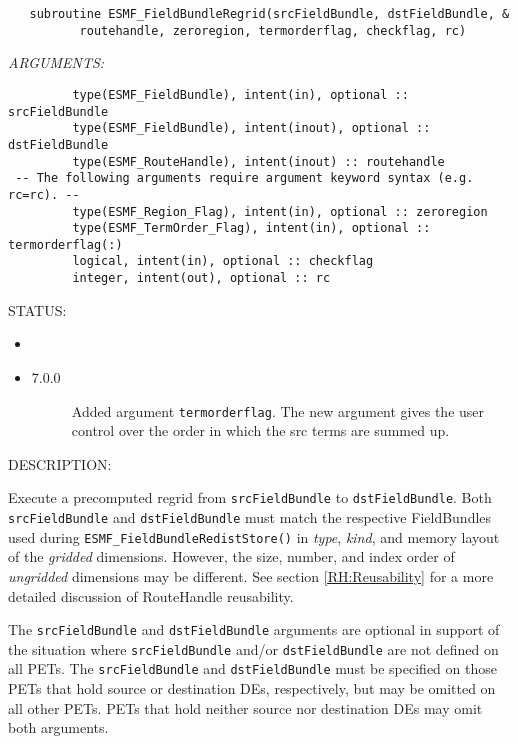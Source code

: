   
\begin{verbatim}   subroutine ESMF_FieldBundleRegrid(srcFieldBundle, dstFieldBundle, &
          routehandle, zeroregion, termorderflag, checkflag, rc)\end{verbatim}{\em ARGUMENTS:}
\begin{verbatim}         type(ESMF_FieldBundle), intent(in), optional :: srcFieldBundle
         type(ESMF_FieldBundle), intent(inout), optional :: dstFieldBundle
         type(ESMF_RouteHandle), intent(inout) :: routehandle
 -- The following arguments require argument keyword syntax (e.g. rc=rc). --
         type(ESMF_Region_Flag), intent(in), optional :: zeroregion
         type(ESMF_TermOrder_Flag), intent(in), optional :: termorderflag(:)
         logical, intent(in), optional :: checkflag
         integer, intent(out), optional :: rc\end{verbatim}
{\sf STATUS:}
   \begin{itemize}
   \item{}
   \item{}
   \begin{description}
   \item[7.0.0] Added argument {\tt termorderflag}.
   The new argument gives the user control over the order in which
   the src terms are summed up.
   \end{description}
   \end{itemize}
  
{\sf DESCRIPTION:\\ }


   \begin{sloppypar}
   Execute a precomputed regrid from {\tt srcFieldBundle}
   to {\tt dstFieldBundle}.
   Both {\tt srcFieldBundle} and {\tt dstFieldBundle} must match the
   respective FieldBundles used during {\tt ESMF\_FieldBundleRedistStore()}
   in {\em type}, {\em kind}, and memory layout of the {\em gridded}
   dimensions. However, the size, number,
   and index order of {\em ungridded} dimensions may be different. See section
   \ref{RH:Reusability} for a more detailed discussion of RouteHandle
   reusability.
   \end{sloppypar}
  
   The {\tt srcFieldBundle} and {\tt dstFieldBundle} arguments are optional in support of
   the situation where {\tt srcFieldBundle} and/or {\tt dstFieldBundle} are not defined on
   all PETs. The {\tt srcFieldBundle} and {\tt dstFieldBundle} must be specified on those
   PETs that hold source or destination DEs, respectively, but may be omitted
   on all other PETs. PETs that hold neither source nor destination DEs may
   omit both arguments.
  
